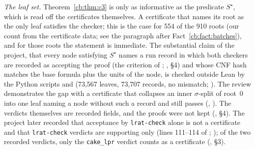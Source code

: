 \begin{remark}\label{cb:rem:use}
\emph{The leaf set.} Theorem~\ref{cb:thm:c3} is only as informative as the predicate $S^\star$, which is read off the
certificates themselves. A certificate that names its root as the only leaf satisfies the checker; this is the case for
554 of the 910 roots (our count from the certificate data; see the paragraph after Fact~\ref{cb:fact:batches}), and
for those roots the statement is immediate. The substantial
claim of the project, that every node satisfying $S^\star$ names a run record in which both checkers are recorded as
accepting the proof (the criterion of ; , \S4) and whose CNF hash
matches the base formula plus the units of the node, is checked outside Lean by
the Python scripts  and  (73{,}567 leaves,
73{,}707 records, no mismatch; ). The review demonstrates the gap with a
certificate that collapses an inner $\sigma$-split of root~0 into one leaf naming a node without such a record and
still passes (, ). The verdicts
themselves are recorded fields, and the proofs were not kept (, \S4). The project later recorded that
acceptance by \texttt{lrat-check} alone is not a certificate and that \texttt{lrat-check} verdicts are supporting only
(lines 111--114 of ; ); of the two recorded
verdicts, only the \texttt{cake\_lpr} verdict counts as a certificate (, \S3).


\end{remark}
